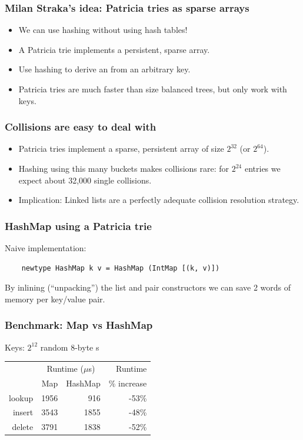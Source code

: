 \documentclass[xetex,mathserif,serif]{beamer}
\newcommand{\code}[1]{\mbox{\texttt{\small{\color{CodeColor}{#1}}}}}
\begin{document}
\begin{frame}
  \frametitle{Milan Straka's idea: Patricia tries as sparse arrays}
  \begin{itemize}
  \item We can use hashing without using hash tables!
  \item A Patricia trie implements a persistent, sparse array.
  \item Use hashing to derive an \code{Int} from an arbitrary
    key.
  \item Patricia tries are much faster than size balanced trees, but
    only work with \code{Int} keys.
  \end{itemize}
\end{frame}

\begin{frame}
  \frametitle{Collisions are easy to deal with}
  \begin{itemize}
  \item Patricia tries implement a sparse, persistent array of size
    $2^{32}$ (or $2^{64}$).
  \item Hashing using this many buckets makes collisions rare: for
    $2^{24}$ entries we expect about 32,000 single collisions.
  \item Implication: Linked lists are a perfectly adequate collision
    resolution strategy.
  \end{itemize}
\end{frame}

\begin{frame}[fragile]
  \frametitle{HashMap using a Patricia trie}

  Naive implementation:

  \begin{lstlisting}
    newtype HashMap k v = HashMap (IntMap [(k, v)])
  \end{lstlisting}

  By inlining (``unpacking'') the list and pair constructors we can
  save 2 words of memory per key/value pair.
\end{frame}

\begin{frame}
  \frametitle{Benchmark: Map vs HashMap}

  Keys: $2^{12}$ random 8-byte \code{ByteString}s

  \bigskip
  \begin{center}
  \begin{tabular}{r|rrr}
                  & \multicolumn{2}{c}{Runtime ($\mu$s)} & Runtime \\
                  & Map & HashMap & \% increase \\
    \hline lookup & 1956 &  916 & -53\% \\
           insert & 3543 & 1855 & -48\% \\
           delete & 3791 & 1838 & -52\% \\
  \end{tabular}
  \end{center}
\end{frame}
\end{document}

